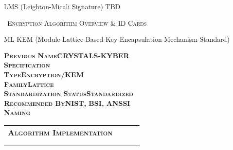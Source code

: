\documentclass[11pt,english,a4paper, landscape]{scrartcl}
\begin{document}
	\begin{algorithmbox}{LMS (Leighton-Micali Signature)}
		\textcolor{themeblue}{TBD}
	\end{algorithmbox}


	\newpage
	{\large \scshape \faLock\, Encryption Algorithm Overview \& ID Cards}\\

	\begin{algorithmbox}{ML-KEM (Module-Lattice-Based Key-Encapsulation Mechanism Standard)}
	\begin{minipage}[t]{0.38\textwidth}
			\scriptsize
			\begin{center}
			\end{center}
			\begin{tabbing}
				\bfseries \scshape Previous Name\hspace{2.5cm}\=CRYSTALS-KYBER\\
				\bfseries \scshape Specification\>\\
				\bfseries \scshape Type\>Encryption/KEM\\
				\bfseries \scshape Family\>Lattice\\
				\bfseries \scshape Standardization Status\>Standardized\\
				\bfseries \scshape Recommended By\>NIST, BSI, ANSSI\\
				\bfseries \scshape Naming\>\tbd
			\end{tabbing}
			\begin{tabular}[t]{l c  c  c}
				\scshape\bfseries Algorithm Implementation &\textcolor{themegreydark}{\faKey}&\textcolor{themegreydark}{\faPen}&\textcolor{themegreydark}{\faQuestionCircle}\\
				&&&\\
				\hline\\



\end{tabular}
\end{minipage}
\end{algorithmbox}
\end{document}

